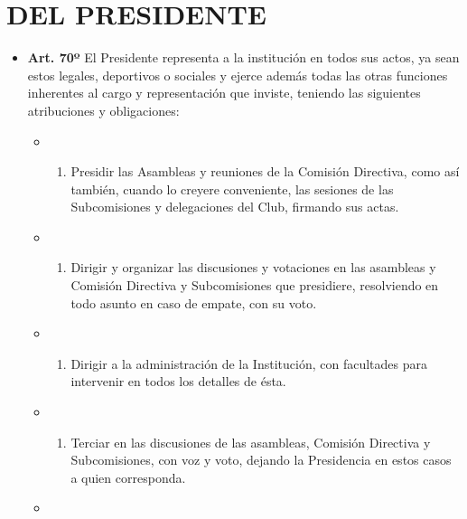 \documentclass[]{book}
\providecommand{\tightlist}{%
  \setlength{\itemsep}{0pt}\setlength{\parskip}{0pt}}
\begin{document}
\chapter{DEL PRESIDENTE}\label{del-presidente}

\begin{itemize}
\tightlist
\item
  \textbf{Art. 70º} El Presidente representa a la institución en todos
  sus actos, ya sean estos legales, deportivos o sociales y ejerce
  además todas las otras funciones inherentes al cargo y representación
  que inviste, teniendo las siguientes atribuciones y obligaciones:

  \begin{itemize}
  \item
    \begin{enumerate}
    \def\labelenumi{\alph{enumi})}
    \tightlist
    \item
      Presidir las Asambleas y reuniones de la Comisión Directiva, como
      así también, cuando lo creyere conveniente, las sesiones de las
      Subcomisiones y delegaciones del Club, firmando sus actas.
    \end{enumerate}
  \item
    \begin{enumerate}
    \def\labelenumi{\alph{enumi})}
    \setcounter{enumi}{1}
    \tightlist
    \item
      Dirigir y organizar las discusiones y votaciones en las asambleas
      y Comisión Directiva y Subcomisiones que presidiere, resolviendo
      en todo asunto en caso de empate, con su voto.
    \end{enumerate}
  \item
    \begin{enumerate}
    \def\labelenumi{\alph{enumi})}
    \setcounter{enumi}{2}
    \tightlist
    \item
      Dirigir a la administración de la Institución, con facultades para
      intervenir en todos los detalles de ésta.
    \end{enumerate}
  \item
    \begin{enumerate}
    \def\labelenumi{\alph{enumi})}
    \setcounter{enumi}{3}
    \tightlist
    \item
      Terciar en las discusiones de las asambleas, Comisión Directiva y
      Subcomisiones, con voz y voto, dejando la Presidencia en estos
      casos a quien corresponda.
    \end{enumerate}
  \item

\end{itemize}
\end{itemize}
\end{document}
